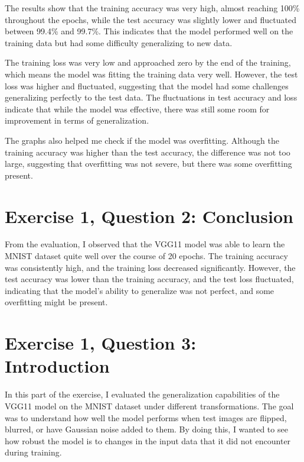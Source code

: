 \documentclass[10pt,letter,notitlepage]{article}
\newcounter{exercise}
\begin{document}
\begin{center}
The results show that the training accuracy was very high, almost reaching 100\% throughout the epochs, while the test accuracy was slightly lower and fluctuated between 99.4\% and 99.7\%. This indicates that the model performed well on the training data but had some difficulty generalizing to new data.

The training loss was very low and approached zero by the end of the training, which means the model was fitting the training data very well. However, the test loss was higher and fluctuated, suggesting that the model had some challenges generalizing perfectly to the test data. The fluctuations in test accuracy and loss indicate that while the model was effective, there was still some room for improvement in terms of generalization.

The graphs also helped me check if the model was overfitting. Although the training accuracy was higher than the test accuracy, the difference was not too large, suggesting that overfitting was not severe, but there was some overfitting present.

\section{Exercise 1, Question 2: Conclusion}
From the evaluation, I observed that the VGG11 model was able to learn the MNIST dataset quite well over the course of 20 epochs. The training accuracy was consistently high, and the training loss decreased significantly. However, the test accuracy was lower than the training accuracy, and the test loss fluctuated, indicating that the model's ability to generalize was not perfect, and some overfitting might be present.

\section{Exercise 1, Question 3: Introduction}
In this part of the exercise, I evaluated the generalization capabilities of the VGG11 model on the MNIST dataset under different transformations. The goal was to understand how well the model performs when test images are flipped, blurred, or have Gaussian noise added to them. By doing this, I wanted to see how robust the model is to changes in the input data that it did not encounter during training.


\end{center}
\end{document}
